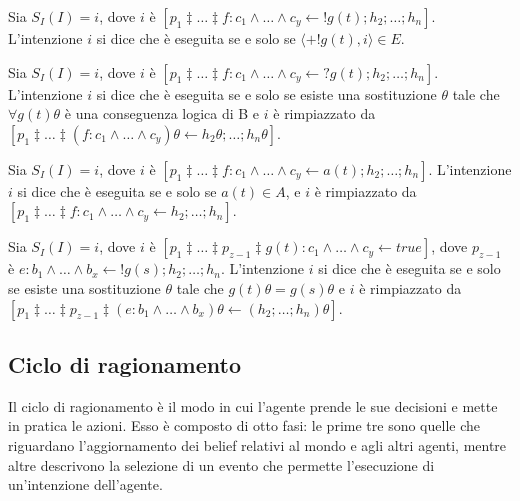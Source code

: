 \smallskip
\begin{defn}
Sia $S_I(I) = i$, dove $i$ è $[p_1 \ddagger \ldots \ddagger f : c_1 \land \ldots \land c_y \leftarrow !g(t);h_2; \ldots; h_n]$. L'intenzione $i$ si dice che è eseguita se e solo se $\langle +!g(t), i \rangle \in E$.
\end{defn}

\smallskip
\begin{defn}
Sia $S_I(I) = i$, dove $i$ è $[p_1 \ddagger \ldots \ddagger f : c_1 \land \ldots \land c_y \leftarrow ?g(t); h_2; \ldots; h_n]$. L'intenzione $i$ si dice che è eseguita se e solo se esiste una sostituzione $\theta$ tale che $\forall g(t) \theta$ è una conseguenza logica di B e $i$ è rimpiazzato da $[p_1 \ddagger \ldots \ddagger (f : c_1 \land \ldots \land c_y) \theta \leftarrow h_2 \theta; \ldots; h_n \theta]$.
\end{defn}

\smallskip
\begin{defn}
Sia $S_I(I) = i$, dove $i$ è $[p_1 \ddagger \ldots \ddagger f : c_1 \land \ldots \land c_y \leftarrow a(t); h_2; \ldots; h_n]$. L'intenzione $i$ si dice che è eseguita se e solo se $a(t) \in A$, e $i$ è rimpiazzato da $[p_1 \ddagger \ldots \ddagger f : c_1 \land \ldots \land c_y \leftarrow h_2; \ldots; h_n]$.
\end{defn}

\smallskip
\begin{defn}
Sia $S_I(I) = i$, dove $i$ è $[p_1 \ddagger \ldots \ddagger p_{z-1} \ddagger g(t) : c_1 \land \ldots \land c_y \leftarrow true]$, dove $p_{z-1}$ è $e : b_1 \land \ldots \land b_x \leftarrow !g(s); h_2; \ldots; h_n$. L'intenzione $i$ si dice che è eseguita  se e solo se esiste una sostituzione $\theta$ tale che $g(t)\theta = g(s)\theta$ e $i$ è rimpiazzato da $[p_1 \ddagger \ldots \ddagger p_{z-1} \ddagger (e : b_1 \land \ldots \land b_x)\theta \leftarrow (h_2; \ldots; h_n) \theta]$.
\end{defn}

\subsection*{Ciclo di ragionamento}\label{ssctn:cicloRagionamentoAgentSpeak}
Il ciclo di ragionamento è il modo in cui l'agente prende le sue decisioni e mette in pratica le azioni. Esso è composto di otto fasi: le prime tre sono quelle che riguardano l'aggiornamento dei belief relativi al mondo e agli altri agenti, mentre altre descrivono la selezione di un evento che permette l'esecuzione di un'intenzione dell'agente.

